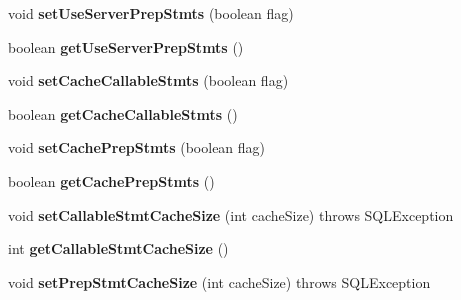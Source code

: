 \begin{DoxyCompactItemize}
void {\bfseries set\+Use\+Server\+Prep\+Stmts} (boolean flag)
\item 
\mbox{\label{interfacecom_1_1mysql_1_1jdbc_1_1_connection_properties_aebd882f33e9b9f92e49599ec65c30405}} 
boolean {\bfseries get\+Use\+Server\+Prep\+Stmts} ()
\item 
\mbox{\label{interfacecom_1_1mysql_1_1jdbc_1_1_connection_properties_aea6aa39a2e528826016de25d34952b65}} 
void {\bfseries set\+Cache\+Callable\+Stmts} (boolean flag)
\item 
\mbox{\label{interfacecom_1_1mysql_1_1jdbc_1_1_connection_properties_aefc403ce88598154321a8077088aed26}} 
boolean {\bfseries get\+Cache\+Callable\+Stmts} ()
\item 
\mbox{\label{interfacecom_1_1mysql_1_1jdbc_1_1_connection_properties_a9780601bbcd628f6addf6e72030e7606}} 
void {\bfseries set\+Cache\+Prep\+Stmts} (boolean flag)
\item 
\mbox{\label{interfacecom_1_1mysql_1_1jdbc_1_1_connection_properties_a596aa7a4e953e1f47f6294a3287cb1a0}} 
boolean {\bfseries get\+Cache\+Prep\+Stmts} ()
\item 
\mbox{\label{interfacecom_1_1mysql_1_1jdbc_1_1_connection_properties_a17d7de46b13fe8cf5118385bccae0822}} 
void {\bfseries set\+Callable\+Stmt\+Cache\+Size} (int cache\+Size)  throws S\+Q\+L\+Exception
\item 
\mbox{\label{interfacecom_1_1mysql_1_1jdbc_1_1_connection_properties_a4d2a8a3396df5f0915866a5ea105c537}} 
int {\bfseries get\+Callable\+Stmt\+Cache\+Size} ()
\item 
\mbox{\label{interfacecom_1_1mysql_1_1jdbc_1_1_connection_properties_a060939b0910bf050a80a551bc6b127da}} 
void {\bfseries set\+Prep\+Stmt\+Cache\+Size} (int cache\+Size)  throws S\+Q\+L\+Exception

\end{DoxyCompactItemize}
